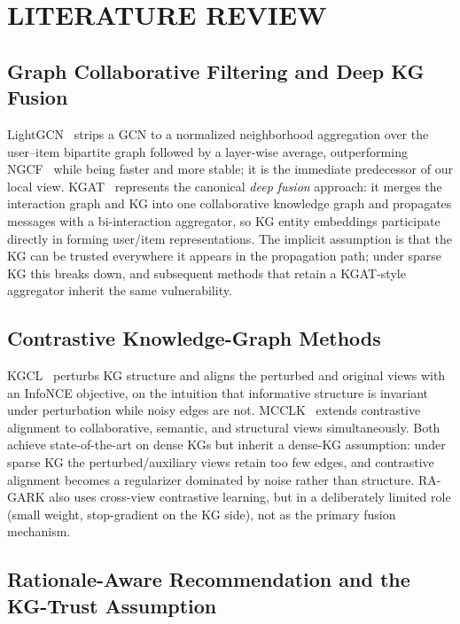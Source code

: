 \documentclass[12pt,a4paper]{article}
\begin{document}
\section{LITERATURE REVIEW}
\label{sec:lit}

\subsection{Graph Collaborative Filtering and Deep KG Fusion}

LightGCN~\cite{he2020lightgcn} strips a GCN to a normalized neighborhood aggregation over the user--item bipartite graph followed by a layer-wise average, outperforming NGCF~\cite{wang2019ngcf} while being faster and more stable; it is the immediate predecessor of our local view. KGAT~\cite{wang2019kgat} represents the canonical \emph{deep fusion} approach: it merges the interaction graph and KG into one collaborative knowledge graph and propagates messages with a bi-interaction aggregator, so KG entity embeddings participate directly in forming user/item representations. The implicit assumption is that the KG can be trusted everywhere it appears in the propagation path; under sparse KG this breaks down, and subsequent methods that retain a KGAT-style aggregator inherit the same vulnerability.

\subsection{Contrastive Knowledge-Graph Methods}

KGCL~\cite{yang2022kgcl} perturbs KG structure and aligns the perturbed and original views with an InfoNCE objective, on the intuition that informative structure is invariant under perturbation while noisy edges are not. MCCLK~\cite{zou2022mcclk} extends contrastive alignment to collaborative, semantic, and structural views simultaneously. Both achieve state-of-the-art on dense KGs but inherit a dense-KG assumption: under sparse KG the perturbed/auxiliary views retain too few edges, and contrastive alignment becomes a regularizer dominated by noise rather than structure. RA-GARK also uses cross-view contrastive learning, but in a deliberately limited role (small weight, stop-gradient on the KG side), not as the primary fusion mechanism.

\subsection{Rationale-Aware Recommendation and the KG-Trust Assumption}
\end{document}
